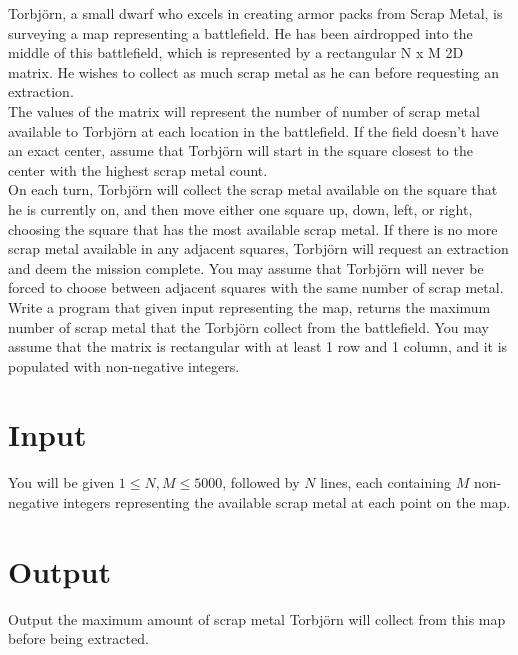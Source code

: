 
\noindent Torbjörn, a small dwarf who excels in creating armor packs from Scrap Metal, is surveying a map representing a
battlefield. He has been airdropped into the middle of this battlefield, which is represented by a rectangular N x M 2D
matrix. He wishes to collect as much scrap metal as he can before requesting an extraction.\\

\noindent The values of the matrix will represent the number of number of scrap metal available to Torbjörn at each location in the
battlefield. If the field doesn’t have an exact center, assume that Torbjörn will start in the square closest to the center 
with the highest scrap metal count. \\

\noindent On each turn, Torbjörn will collect the scrap metal available on the square that he is currently on, and then move
either one square up, down, left, or right, choosing the square that has the most available scrap metal. If there is no
more scrap metal available in any adjacent squares, Torbjörn will request an extraction and deem the mission complete.
You may assume that Torbjörn will never be forced to choose between adjacent squares with the same number of scrap
metal. \\

\noindent Write a program that given input representing the map, returns the maximum number of scrap metal that the Torbjörn
collect from the battlefield. You may assume that the matrix is rectangular with at least 1 row and 1 column, and it is
populated with non-negative integers. \\

\section*{Input}
You will be given $1 \leq N,M \leq 5000$, followed by $N$ lines, each containing $M$ non-negative integers representing the 
available scrap metal at each point on the map.
\section*{Output}
Output the maximum amount of scrap metal Torbjörn will collect from this map before being extracted.\\
